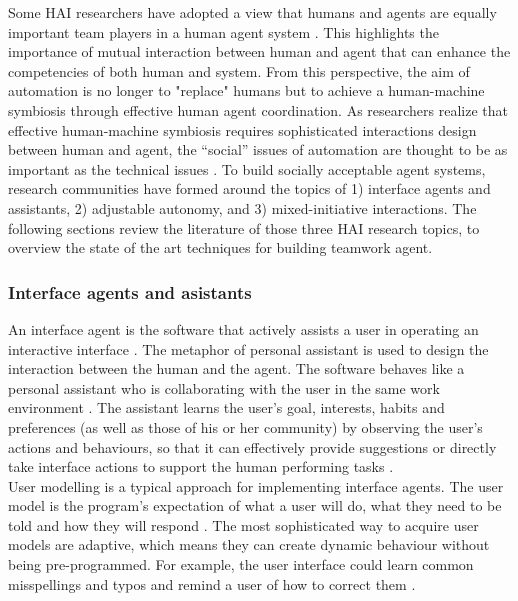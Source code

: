 Some \ac{HAI} researchers have adopted a view that humans and agents are equally important team players in a human agent system \citep{Sukthankara}. This highlights the importance of mutual interaction between human and agent that can enhance the competencies of both human and system. From this perspective, the aim of automation is no longer to "replace" humans but to achieve a human-machine symbiosis through effective human agent coordination. As researchers realize that effective human-machine symbiosis requires sophisticated interactions design between human and agent, the ``social'' issues of automation are thought to be as important as the technical issues \citep{Bradshaw2011}. To build socially acceptable agent systems, research communities have formed around the topics of 1) interface agents and assistants, 2) adjustable autonomy, and 3) mixed-initiative interactions. The following sections review the literature of those three \ac{HAI} research topics, to overview the state of the art techniques for building teamwork agent. 

\subsubsection{Interface agents and asistants}\label{sec:lrinterfaceagent}
An interface agent is the software that actively assists a user in operating an interactive interface \citep{Lieberman2003}. The metaphor of personal assistant is used to design the interaction between the human and the agent. The software behaves like a personal assistant who is collaborating with the user in the same work environment \citep{Lieberman1997}. The assistant learns the user's goal, interests, habits and preferences (as well as those of his or her community) by observing the user's actions and behaviours,  so that it can effectively provide suggestions or directly take interface actions to support the human performing tasks \citep{Maes1994}.\\

User modelling is a typical approach for implementing interface agents. The user model is the program's expectation of what a user will do, what they need to be told and how they will respond \citep{Lieberman2003}.  The most sophisticated way to acquire user models are adaptive, which means they can create dynamic behaviour without being pre-programmed. For example, the user interface could learn common misspellings and typos and remind a user of how to correct them \citep{Lieberman2003}.\\

